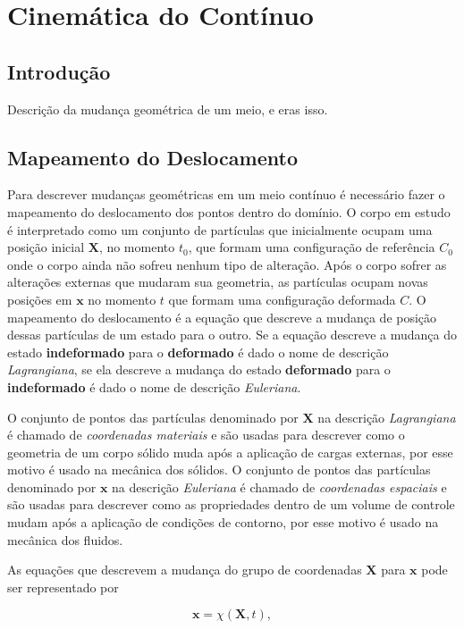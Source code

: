 \chapter{Cinemática do Contínuo}
\section{Introdução}
Descrição da mudança geométrica de um meio, e eras isso.

\section{Mapeamento do Deslocamento}
Para descrever mudanças geométricas em um meio contínuo é necessário fazer o mapeamento do deslocamento dos pontos dentro do domínio. O corpo em estudo é interpretado como um conjunto de partículas que inicialmente ocupam uma posição inicial $\mathbf{X}$, no momento $t_0$, que formam uma configuração de referência $C_0$ onde o corpo ainda não sofreu nenhum tipo de alteração. Após o corpo sofrer as alterações externas que mudaram sua geometria, as partículas ocupam novas posições em $\mathbf{x}$ no momento $t$ que formam uma configuração deformada $C$. O mapeamento do deslocamento é a equação que descreve a mudança de posição dessas partículas de um estado para o outro. Se a equação descreve a mudança do estado \textbf{indeformado} para o \textbf{deformado} é dado o nome de descrição \textit{Lagrangiana}, se ela descreve a mudança do estado \textbf{deformado} para o \textbf{indeformado} é dado o nome de descrição \textit{Euleriana}. 

O conjunto de pontos das partículas denominado por $\mathbf{X}$ na descrição \textit{Lagrangiana} é chamado de \textit{coordenadas materiais} e são usadas para descrever como o geometria de um corpo sólido muda após a aplicação de cargas externas, por esse motivo é usado na mecânica dos sólidos. O conjunto de pontos das partículas denominado por $\mathbf{x}$ na descrição \textit{Euleriana} é chamado de \textit{coordenadas espaciais} e são usadas para descrever como as propriedades dentro de um volume de controle mudam após a aplicação de condições de contorno, por esse motivo é usado na mecânica dos fluidos.

As equações que descrevem a mudança do grupo de coordenadas $\mathbf{X}$ para $\mathbf{x}$ pode ser representado por

\begin{equation}
	\mathbf{x} = \chi(\mathbf{X}, t),
\end{equation}

